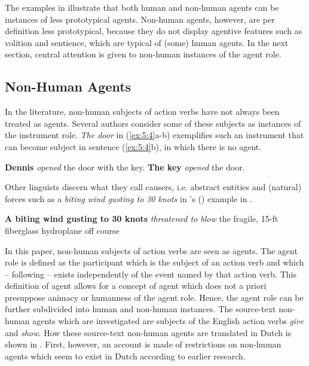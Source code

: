 \documentclass[output=paper]{LSP/langsci}
\begin{document}

The examples in  illustrate that both human and non-human agents can be instances of less prototypical agents. Non-human agents, however, are per definition less prototypical, because they do not display agentive features such as volition and sentience, which are typical of (some) human agents. In the next section, central attention is given to non-human instances of the agent role.

\subsection{Non-Human Agents} \label{sec:5:2:2}

In the literature, non-human subjects of action verbs have not always been treated as agents. Several authors \citep[see e.g.][]{Fillmore1968,Quirk1972,Levin1993} consider some of these subjects as instances of the instrument role. \textit{The door} in (\ref{ex:5:4}a-b) exemplifies such an instrument that can become subject in sentence (\ref{ex:5:4}b), in which there is no agent.

\ea \label{ex:5:4}
\ea \textbf{Dennis} \textit{opened} the door with the key.
\ex \textbf{The key} \textit{opened} the door. 
\z
\z

Other linguists \citep[see e.g.][]{Biber1999,Talmy2000} discern what they call causers, i.e. abstract entities and (natural) forces such as a \textit{biting wind gusting to 30 knots} in \citeauthor{Biber1999}’s (\citeyear{Biber1999}) example in .

\ea \label{ex:5:5}
\ea \textbf{A biting wind gusting to 30 knots} \textit{threatened to blow} the fragile, 15-ft fiberglass hydroplane off course
\z
\z

In this paper, non-human subjects of action verbs are seen as agents. The agent role is defined as the participant which is the subject of an action verb and which – following \citet{Dowty1991} – exists independently of the event named by that action verb. This definition of agent allows for a concept of agent which does not a priori presuppose animacy or humanness of the agent role. Hence, the agent role can be further subdivided into human and non-human instances. The source-text non-human agents which are investigated are subjects of the English action verbs \textit{give} and \textit{show}. How these source-text non-human agents are translated in Dutch is shown in . First, however, an account is made of restrictions on non-human agents which seem to exist in Dutch according to earlier research.
\end{document}
